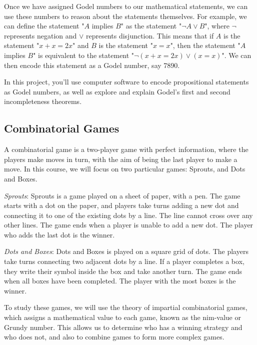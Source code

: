 \documentclass{article}
\begin{document}
\vspace{3mm}
Once we have assigned Godel numbers to our mathematical statements, we can use these numbers to reason about the statements themselves. For example, we can define the statement "$A$ implies $B$" as the statement "$\neg A \vee B$", where $\neg$ represents negation and $\vee$ represents disjunction. This means that if $A$ is the statement "$x + x = 2x$" and $B$ is the statement "$x = x$", then the statement "$A$ implies $B$" is equivalent to the statement "$\neg(x + x = 2x) \vee (x = x)$". We can then encode this statement as a Godel number, say 7890.

\vspace{3mm}
In this project, you'll use computer software to encode propositional statements as Godel numbers, as well as explore and explain Godel's first and second incompleteness theorems.

\pagebreak 

\subsection*{Combinatorial Games}
A combinatorial game is a two-player game with perfect information, where the players make moves in turn, with the aim of being the last player to make a move. In this course, we will focus on two particular games: Sprouts, and Dots and Boxes.

\vspace{3mm}
\textit{Sprouts}: Sprouts is a game played on a sheet of paper, with a pen. The game starts with a dot on the paper, and players take turns adding a new dot and connecting it to one of the existing dots by a line. The line cannot cross over any other lines. The game ends when a player is unable to add a new dot. The player who adds the last dot is the winner.

\vspace{3mm}
\textit{Dots and Boxes}: Dots and Boxes is played on a square grid of dots. The players take turns connecting two adjacent dots by a line. If a player completes a box, they write their symbol inside the box and take another turn. The game ends when all boxes have been completed. The player with the most boxes is the winner.

\vspace{3mm}
To study these games, we will use the theory of impartial combinatorial games, which assigns a mathematical value to each game, known as the nim-value or Grundy number. This allows us to determine who has a winning strategy and who does not, and also to combine games to form more complex games.
\end{document}
